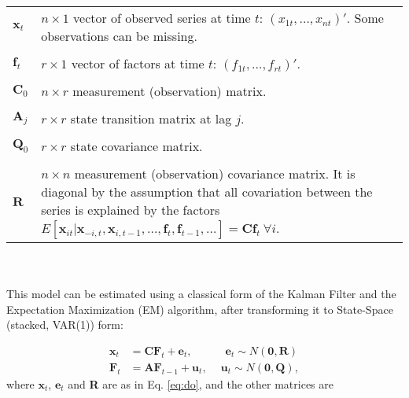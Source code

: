\documentclass[a4paper]{article}
\begin{document}
\begin{tabular}{p{1cm}p{12cm}}
$\textbf{x}_t$ & $n \times 1$ vector of observed series at time $t$: $(x_{1t}, \dots, x_{nt})'$. Some observations can be missing.  \\\\
$\textbf{f}_t$ & $r \times 1$ vector of factors at time $t$: $(f_{1t}, \dots, f_{rt})'$.\\\\
$\textbf{C}_0$ & $n \times r$ measurement (observation) matrix.\\\\
$\textbf{A}_j$ & $r \times r$ state transition matrix at lag $j$. \\\\
$\textbf{Q}_0$ & $r \times r$ state covariance matrix.\\\\
$\textbf{R}$ & $n \times n$ measurement (observation) covariance matrix. It is diagonal by the assumption that all covariation between the series is explained by the factors $E[\textbf{x}_{it}|\textbf{x}_{-i,t},\textbf{x}_{i,t-1}, \dots, \textbf{f}_t, \textbf{f}_{t-1}, \dots] = \textbf{Cf}_t\ \forall i$.
\end{tabular}
\\\\

This model can be estimated using a classical form of the Kalman Filter and the Expectation Maximization (EM) algorithm, after transforming it to State-Space (stacked, VAR(1)) form:

\begin{align}
\textbf{x}_t &= \textbf{C} \textbf{F}_t + \textbf{e}_t, \qquad\quad \textbf{e}_t\sim N(\textbf{0}, \textbf{R}) \\
\textbf{F}_t &= \textbf{AF}_{t-1} + \textbf{u}_t, \quad\ \textbf{u}_t\sim  N(\textbf{0}, \textbf{Q}),
\end{align}
where $\textbf{x}_t$, $\textbf{e}_t$ and \textbf{R} are as in Eq. \ref{eq:do}, and the other matrices are
\end{document}

